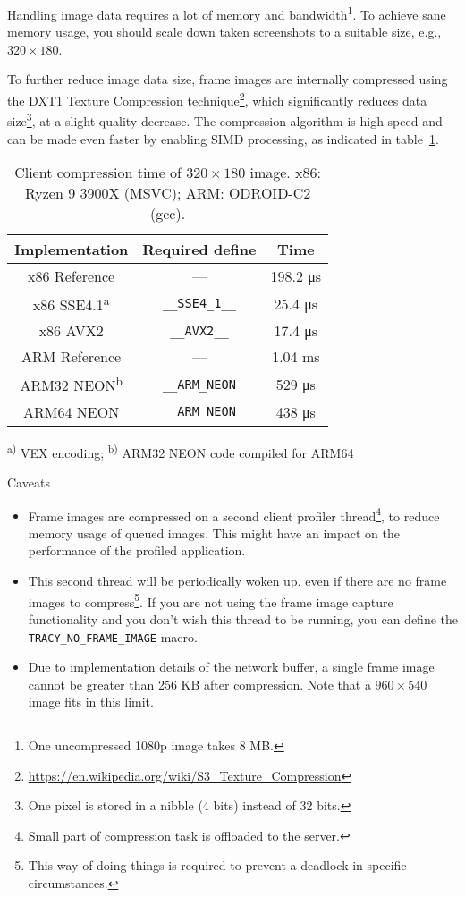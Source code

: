 \documentclass[hidelinks,titlepage,a4paper,twoside]{article}
\begin{document}
Handling image data requires a lot of memory and bandwidth\footnote{One uncompressed 1080p image takes 8 MB.}. To achieve sane memory usage, you should scale down taken screenshots to a suitable size, e.g., $320\times180$.

To further reduce image data size, frame images are internally compressed using the DXT1 Texture Compression technique\footnote{\url{https://en.wikipedia.org/wiki/S3_Texture_Compression}}, which significantly reduces data size\footnote{One pixel is stored in a nibble (4 bits) instead of 32 bits.}, at a slight quality decrease. The compression algorithm is high-speed and can be made even faster by enabling SIMD processing, as indicated in table~\ref{EtcSimd}.

\begin{table}[h]
\centering
\begin{tabular}[h]{c|c|c}
\textbf{Implementation} & \textbf{Required define} & \textbf{Time} \\ \hline
x86 Reference & --- & 198.2 \si{\micro\second} \\
x86 SSE4.1\textsuperscript{a} & \texttt{\_\_SSE4\_1\_\_} & 25.4 \si{\micro\second} \\
x86 AVX2 & \texttt{\_\_AVX2\_\_} & 17.4 \si{\micro\second} \\
ARM Reference & --- & 1.04 \si{\milli\second} \\
ARM32 NEON\textsuperscript{b} & \texttt{\_\_ARM\_NEON} & 529 \si{\micro\second} \\
ARM64 NEON & \texttt{\_\_ARM\_NEON} & 438 \si{\micro\second}
\end{tabular}

\vspace{1em}
\textsuperscript{a)} VEX encoding; \hspace{0.5em} \textsuperscript{b)} ARM32 NEON code compiled for ARM64
\caption{Client compression time of $320\times180$ image. x86: Ryzen 9 3900X (MSVC); ARM: ODROID-C2 (gcc).}
\label{EtcSimd}
\end{table}

\begin{bclogo}[
noborder=true,
couleur=black!5,
logo=\bcattention
]{Caveats}
\begin{itemize}
\item Frame images are compressed on a second client profiler thread\footnote{Small part of compression task is offloaded to the server.}, to reduce memory usage of queued images. This might have an impact on the performance of the profiled application.
\item This second thread will be periodically woken up, even if there are no frame images to compress\footnote{This way of doing things is required to prevent a deadlock in specific circumstances.}. If you are not using the frame image capture functionality and you don't wish this thread to be running, you can define the \texttt{TRACY\_NO\_FRAME\_IMAGE} macro.
\item Due to implementation details of the network buffer, a single frame image cannot be greater than 256 KB after compression. Note that a $960\times540$ image fits in this limit.
\end{itemize}
\end{bclogo}
\end{document}
